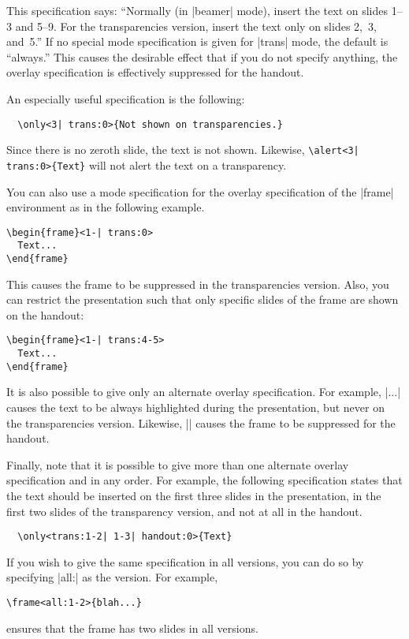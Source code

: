 This specification says: ``Normally (in |beamer| mode), insert the text on slides 1--3 and 5--9. For the transparencies version, insert the text only on slides 2,~3, and~5.'' If no special mode specification is given for |trans| mode, the default is ``always.'' This causes the desirable effect that if you do not specify anything, the overlay specification is effectively suppressed for the handout.

An especially useful specification is the following:
\begin{verbatim}
  \only<3| trans:0>{Not shown on transparencies.}
\end{verbatim}

Since there is no zeroth slide, the text is not shown. Likewise, \verb!\alert<3| trans:0>{Text}! will not alert the text on a transparency.

You can also use a mode specification for the overlay specification of the |{frame}| environment as in the following example.
\begin{verbatim}
\begin{frame}<1-| trans:0>
  Text...
\end{frame}
\end{verbatim}

This causes the frame to be suppressed in the transparencies version. Also, you can restrict the presentation such that only specific slides of the frame are shown on the handout:
\begin{verbatim}
\begin{frame}<1-| trans:4-5>
  Text...
\end{frame}
\end{verbatim}

It is also possible to give only an alternate overlay specification. For example, |\alert<trans:0>{...}| causes the text to be always highlighted during the presentation, but never on the transparencies version. Likewise, || causes the frame to be suppressed for the handout.

Finally, note that it is possible to give more than one alternate overlay specification and in any order. For example, the following specification states that the text should be inserted on the first three slides in the presentation, in the first two slides of the transparency version, and not at all in the handout.
\begin{Verbatim}
  \only<trans:1-2| 1-3| handout:0>{Text}
\end{Verbatim}

If you wish to give the same specification in all versions, you can do so by specifying |all:| as the version. For example,
\begin{Verbatim}
\frame<all:1-2>{blah...}
\end{Verbatim}

ensures that the frame has two slides in all versions.
